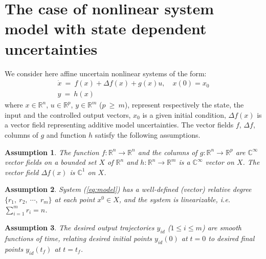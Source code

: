 \documentclass[twoside,leqno,onecolumn]{article}
\newtheorem{assumption}{Assumption}
\begin{document}
\section{The case of nonlinear system model with state dependent
uncertainties}\label{sec:problem} We consider here affine
uncertain nonlinear systems of the form:
\begin{equation}
\begin{array}{l}
\displaystyle \dot{x} ~=~ f(x) + \Delta f(x) + g(x)u,\quad x(0) = x_0\\
\displaystyle y~=~ h(x)
\end{array}
\label{eq:model}
\end{equation}
where $x\in\mathbb{R}^n$, $u\in \mathbb{R}^p$, $y\in\mathbb{R}^m$
($p~\geq~ m$), represent respectively the state, the input and the
controlled output vectors, $x_0$ is a given initial condition,
$\Delta f(x)$ is a vector field representing additive model
uncertainties. The vector fields $f$, $\Delta f$, columns of $g$
and function $h$ satisfy the following assumptions.

\begin{assumption}
The function $f:\mathbb{R}^n \rightarrow \mathbb{R}^n$ and the
columns of $g: \mathbb{R}^n \rightarrow \mathbb{R}^p$ are
$\mathbb{C}^{\infty}$ vector fields on a bounded set $X$ of
$\mathbb{R}^n$ and $h : \mathbb{R}^n \rightarrow \mathbb{R}^m$ is
a $\mathbb{C}^{\infty}$ vector on $X$. The vector field $\Delta
f(x) $ is $\mathbb{C}^1$ on $X$.
\end{assumption}

\begin{assumption}
System (\ref{eq:model}) has a well-defined (vector) relative
degree $\{r_1,~r_2,~\cdots,~r_m\}$ at each point $x^0\in X$, and
the system is linearizable, i.e. $\sum_{i=1}^m r_i=n$.
\end{assumption}



\begin{assumption}
The desired output trajectories $y_{id}$ ($1\leq i \leq m$) are
smooth functions of time, relating desired initial points
$y_{id}(0)$ at $t=0$ to desired final points $y_{id}(t_f)$ at
$t=t_f$.
\end{assumption}
\end{document}
